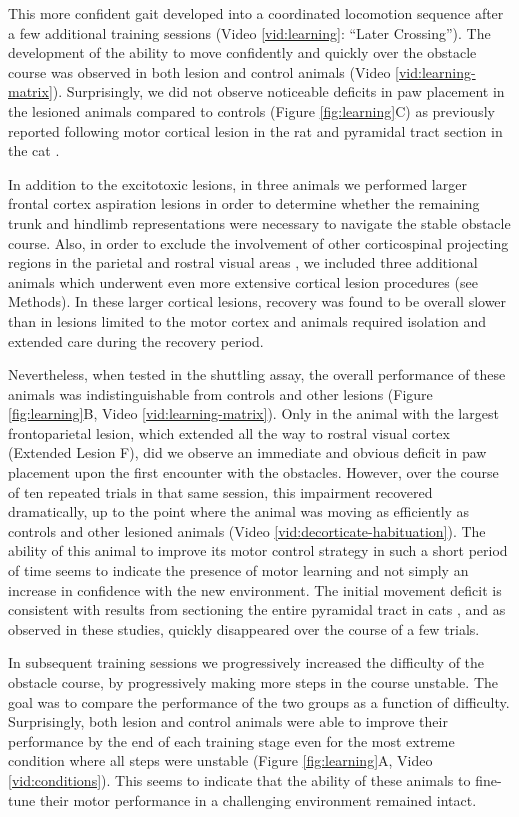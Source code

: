 This more confident gait developed into a coordinated locomotion sequence after a few additional training sessions (Video \ref{vid:learning}: ``Later Crossing''). The development of the ability to move confidently and quickly over the obstacle course was observed in both lesion and control animals (Video \ref{vid:learning-matrix}). Surprisingly, we did not observe noticeable deficits in paw placement in the lesioned animals compared to controls (Figure \ref{fig:learning}C) as previously reported following motor cortical lesion in the rat \cite{Metz2002} and pyramidal tract section in the cat \cite{Liddell1944}.

In addition to the excitotoxic lesions, in three animals we performed larger frontal cortex aspiration lesions in order to determine whether the remaining trunk and hindlimb representations were necessary to navigate the stable obstacle course. Also, in order to exclude the involvement of other corticospinal projecting regions in the parietal and rostral visual areas \cite{Miller1987}, we included three additional animals which underwent even more extensive cortical lesion procedures (see Methods). In these larger cortical lesions, recovery was found to be overall slower than in lesions limited to the motor cortex and animals required isolation and extended care during the recovery period.

Nevertheless, when tested in the shuttling assay, the overall performance of these animals was indistinguishable from controls and other lesions (Figure \ref{fig:learning}B, Video \ref{vid:learning-matrix}). Only in the animal with the largest frontoparietal lesion, which extended all the way to rostral visual cortex (Extended Lesion F), did we observe an immediate and obvious deficit in paw placement upon the first encounter with the obstacles. However, over the course of ten repeated trials in that same session, this impairment recovered dramatically, up to the point where the animal was moving as efficiently as controls and other lesioned animals (Video \ref{vid:decorticate-habituation}). The ability of this animal to improve its motor control strategy in such a short period of time seems to indicate the presence of motor learning and not simply an increase in confidence with the new environment. The initial movement deficit is consistent with results from sectioning the entire pyramidal tract in cats \cite{Liddell1944}, and as observed in these studies, quickly disappeared over the course of a few trials.

In subsequent training sessions we progressively increased the difficulty of the obstacle course, by progressively making more steps in the course unstable. The goal was to compare the performance of the two groups as a function of difficulty. Surprisingly, both lesion and control animals were able to improve their performance by the end of each training stage even for the most extreme condition where all steps were unstable (Figure \ref{fig:learning}A, Video \ref{vid:conditions}). This seems to indicate that the ability of these animals to fine-tune their motor performance in a challenging environment remained intact.

